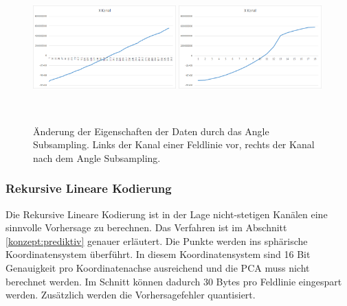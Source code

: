 \begin{figure}[!htbp]
	\center
	\includegraphics[width=0.49\textwidth,height=5cm,keepaspectratio]{./pictures/resultate/loesung2/variante1/channel_sub.png}
	\includegraphics[width=0.49\textwidth,height=5cm,keepaspectratio]{./pictures/resultate/loesung2/variante1/channel_angle.png}
	\caption{Änderung der Eigenschaften der Daten durch das Angle Subsampling. Links der Kanal einer Feldlinie vor, rechts der Kanal nach dem Angle Subsampling.}
	\label{resultate:loesung2:adaptive:channel}
\end{figure}

\subsubsection{Rekursive Lineare Kodierung} \label{resultate:loesung2:wavelet}
Die Rekursive Lineare Kodierung ist in der Lage nicht-stetigen Kanälen eine sinnvolle Vorhersage zu berechnen. Das Verfahren ist im Abschnitt \ref{konzept:prediktiv} genauer erläutert. Die Punkte werden ins sphärische Koordinatensystem überführt. In diesem Koordinatensystem sind 16 Bit Genauigkeit pro Koordinatenachse ausreichend und die PCA muss nicht berechnet werden. Im Schnitt können dadurch 30 Bytes pro Feldlinie eingespart werden. Zusätzlich werden die Vorhersagefehler quantisiert.

